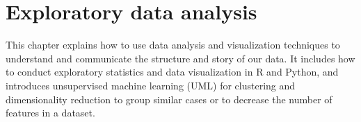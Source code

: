 \chapter{Exploratory data analysis}

This chapter explains how to use data analysis and visualization techniques to understand and communicate the structure and story of our data.  It includes how to conduct exploratory statistics and data visualization in R and Python, and introduces unsupervised machine learning (UML) for clustering and dimensionality reduction to group similar cases or to decrease the number of features in a dataset.







